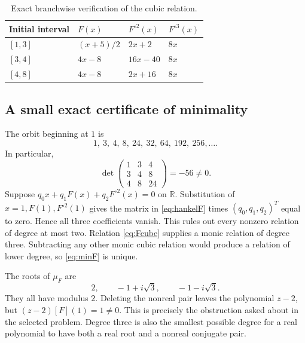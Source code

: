 \documentclass[11pt,letterpaper]{article}
\theoremstyle{definition}
\theoremstyle{remark}
\newcommand{\R}{\mathbb R}
\newcommand{\itn}[2]{#1^{\circ #2}}
\begin{document}
\begin{table}[htbp]
\centering
\caption{Exact branchwise verification of the cubic relation.}
\label{tab:itinerary}
\begin{tabular}{llll}
\toprule
Initial interval & $F(x)$ & $\itn{F}{2}(x)$ & $\itn{F}{3}(x)$\\
\midrule
$[1,3]$ & $(x+5)/2$ & $2x+2$ & $8x$\\
$[3,4]$ & $4x-8$ & $16x-40$ & $8x$\\
$[4,8]$ & $4x-8$ & $2x+16$ & $8x$\\
\bottomrule
\end{tabular}
\end{table}

\subsection{A small exact certificate of minimality}

The orbit beginning at $1$ is
\begin{equation}
  1,\ 3,\ 4,\ 8,\ 24,\ 32,\ 64,\ 192,\ 256,\ldots.
  \label{eq:orbitF}
\end{equation}
In particular,
\begin{equation}
  \det
  \begin{pmatrix}
    1&3&4\\
    3&4&8\\
    4&8&24
  \end{pmatrix}=-56\ne0.
  \label{eq:hankelF}
\end{equation}
Suppose $q_0x+q_1F(x)+q_2\itn{F}{2}(x)=0$ on $\R$.
Substitution of $x=1,F(1),\itn{F}{2}(1)$ gives the matrix in
\eqref{eq:hankelF} times $(q_0,q_1,q_2)^T$ equal to zero. Hence all three
coefficients vanish. This rules out every nonzero relation of degree at
most two. Relation \eqref{eq:Fcube} supplies a monic relation of degree
three. Subtracting any other monic cubic relation would produce a relation
of lower degree, so \eqref{eq:minF} is unique.

The roots of $\mu_F$ are
\begin{equation}
  2,\qquad -1+i\sqrt3,\qquad -1-i\sqrt3.
\end{equation}
They all have modulus $2$. Deleting the nonreal pair leaves the polynomial
$z-2$, but $(z-2)[F](1)=1\ne0$. This is precisely the obstruction asked
about in the selected problem. Degree three is also the smallest possible
degree for a real polynomial to have both a real root and a nonreal
conjugate pair.
\end{document}
